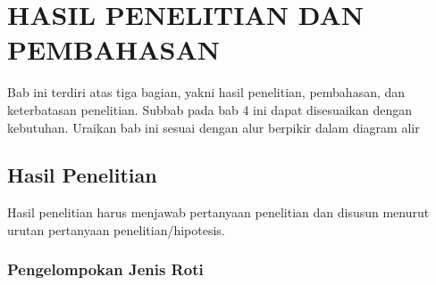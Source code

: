 \chapter{HASIL PENELITIAN DAN PEMBAHASAN}
Bab ini terdiri atas tiga bagian, yakni hasil penelitian, pembahasan, dan keterbatasan penelitian. Subbab pada bab 4 ini dapat disesuaikan dengan kebutuhan. Uraikan bab ini sesuai dengan alur berpikir dalam diagram alir

\section{Hasil Penelitian}
Hasil penelitian harus menjawab pertanyaan penelitian dan disusun menurut urutan pertanyaan penelitian/hipotesis.

\subsection{Pengelompokan Jenis Roti}
